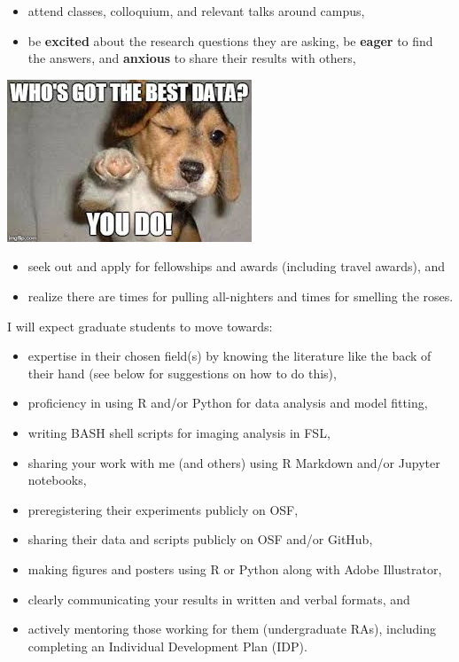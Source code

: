 \documentclass[]{book}
\providecommand{\tightlist}{%
  \setlength{\itemsep}{0pt}\setlength{\parskip}{0pt}}
\begin{document}
\begin{itemize}
\tightlist
\item
  attend classes, colloquium, and relevant talks around campus,\\
\item
  be \textbf{excited} about the research questions they are asking, be \textbf{eager} to find the answers, and \textbf{anxious} to share their results with others,
\end{itemize}

\includegraphics{images/bestdata.jpeg}

\begin{itemize}
\tightlist
\item
  seek out and apply for fellowships and awards (including travel awards), and\\
\item
  realize there are times for pulling all-nighters and times for smelling the roses.
\end{itemize}

I will expect graduate students to move towards:

\begin{itemize}
\tightlist
\item
  expertise in their chosen field(s) by knowing the literature like the back of their hand (see below for suggestions on how to do this),
\item
  proficiency in using R and/or Python for data analysis and model fitting,
\item
  writing BASH shell scripts for imaging analysis in FSL,
\item
  sharing your work with me (and others) using R Markdown and/or Jupyter notebooks,
\item
  preregistering their experiments publicly on OSF,
\item
  sharing their data and scripts publicly on OSF and/or GitHub,
\item
  making figures and posters using R or Python along with Adobe Illustrator,
\item
  clearly communicating your results in written and verbal formats, and
\item
  actively mentoring those working for them (undergraduate RAs), including completing an Individual Development Plan (IDP).
\end{itemize}
\end{document}
